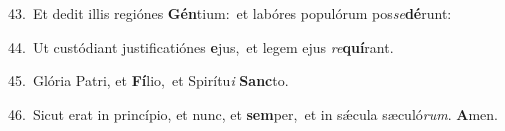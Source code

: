 {\numbfont\textcolor{\numbcolor}{43.}}~Et dedit illis regiónes \textbf{Gén}\-tium:~\star et labóres populórum pos\-\textit{se}\-\textbf{dé}runt:\par
{\numbfont\textcolor{\numbcolor}{44.}}~Ut custódiant justificatiónes \textbf{e}\-jus,~\star et legem ejus \textit{re}\-\textbf{quí}rant.\par
{\numbfont\textcolor{\numbcolor}{45.}}~Glória Patri, et \textbf{Fí}\-lio,~\star et Spirítu\textit{i} \textbf{Sanc}\-to.\par
{\numbfont\textcolor{\numbcolor}{46.}}~Sicut erat in princípio, et nunc, et \textbf{sem}\-per,~\star et in sǽcula sæculó\-\textit{rum}\-. \textbf{A}\-men.\par
